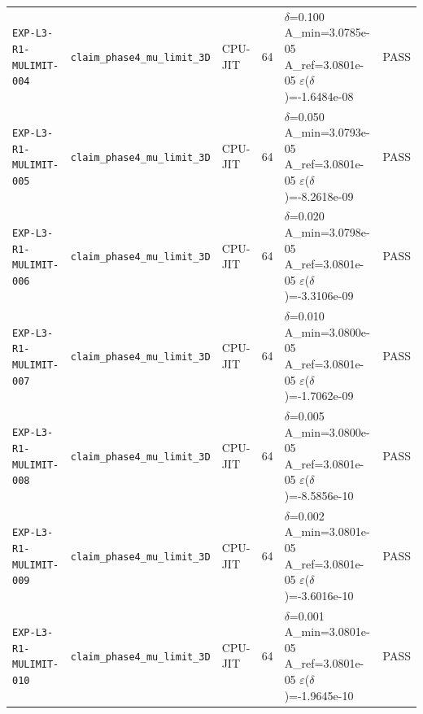 {\begin{longtable}{@{}>{\raggedright\arraybackslash}p{} >{\raggedright\arraybackslash}p{} l l >{\raggedright\arraybackslash}p{} l@{}}
\texttt{EXP-\allowbreak{}L3-\allowbreak{}R1-\allowbreak{}MULIMIT-\allowbreak{}004} & \texttt{claim\_\allowbreak{}phase4\_\allowbreak{}mu\_\allowbreak{}limit\_\allowbreak{}3D} & CPU-\allowbreak{}JIT & 64 & $\delta$=\allowbreak{}0.100  A\_\allowbreak{}min=\allowbreak{}3.0785e-05  A\_\allowbreak{}ref=\allowbreak{}3.0801e-05  $\varepsilon$($\delta$)=-\allowbreak{}1.6484e-08 & \textsf{PASS}\\
\texttt{EXP-\allowbreak{}L3-\allowbreak{}R1-\allowbreak{}MULIMIT-\allowbreak{}005} & \texttt{claim\_\allowbreak{}phase4\_\allowbreak{}mu\_\allowbreak{}limit\_\allowbreak{}3D} & CPU-\allowbreak{}JIT & 64 & $\delta$=\allowbreak{}0.050  A\_\allowbreak{}min=\allowbreak{}3.0793e-05  A\_\allowbreak{}ref=\allowbreak{}3.0801e-05  $\varepsilon$($\delta$)=-\allowbreak{}8.2618e-09 & \textsf{PASS}\\
\texttt{EXP-\allowbreak{}L3-\allowbreak{}R1-\allowbreak{}MULIMIT-\allowbreak{}006} & \texttt{claim\_\allowbreak{}phase4\_\allowbreak{}mu\_\allowbreak{}limit\_\allowbreak{}3D} & CPU-\allowbreak{}JIT & 64 & $\delta$=\allowbreak{}0.020  A\_\allowbreak{}min=\allowbreak{}3.0798e-05  A\_\allowbreak{}ref=\allowbreak{}3.0801e-05  $\varepsilon$($\delta$)=-\allowbreak{}3.3106e-09 & \textsf{PASS}\\
\texttt{EXP-\allowbreak{}L3-\allowbreak{}R1-\allowbreak{}MULIMIT-\allowbreak{}007} & \texttt{claim\_\allowbreak{}phase4\_\allowbreak{}mu\_\allowbreak{}limit\_\allowbreak{}3D} & CPU-\allowbreak{}JIT & 64 & $\delta$=\allowbreak{}0.010  A\_\allowbreak{}min=\allowbreak{}3.0800e-05  A\_\allowbreak{}ref=\allowbreak{}3.0801e-05  $\varepsilon$($\delta$)=-\allowbreak{}1.7062e-09 & \textsf{PASS}\\
\texttt{EXP-\allowbreak{}L3-\allowbreak{}R1-\allowbreak{}MULIMIT-\allowbreak{}008} & \texttt{claim\_\allowbreak{}phase4\_\allowbreak{}mu\_\allowbreak{}limit\_\allowbreak{}3D} & CPU-\allowbreak{}JIT & 64 & $\delta$=\allowbreak{}0.005  A\_\allowbreak{}min=\allowbreak{}3.0800e-05  A\_\allowbreak{}ref=\allowbreak{}3.0801e-05  $\varepsilon$($\delta$)=-\allowbreak{}8.5856e-10 & \textsf{PASS}\\
\texttt{EXP-\allowbreak{}L3-\allowbreak{}R1-\allowbreak{}MULIMIT-\allowbreak{}009} & \texttt{claim\_\allowbreak{}phase4\_\allowbreak{}mu\_\allowbreak{}limit\_\allowbreak{}3D} & CPU-\allowbreak{}JIT & 64 & $\delta$=\allowbreak{}0.002  A\_\allowbreak{}min=\allowbreak{}3.0801e-05  A\_\allowbreak{}ref=\allowbreak{}3.0801e-05  $\varepsilon$($\delta$)=-\allowbreak{}3.6016e-10 & \textsf{PASS}\\
\texttt{EXP-\allowbreak{}L3-\allowbreak{}R1-\allowbreak{}MULIMIT-\allowbreak{}010} & \texttt{claim\_\allowbreak{}phase4\_\allowbreak{}mu\_\allowbreak{}limit\_\allowbreak{}3D} & CPU-\allowbreak{}JIT & 64 & $\delta$=\allowbreak{}0.001  A\_\allowbreak{}min=\allowbreak{}3.0801e-05  A\_\allowbreak{}ref=\allowbreak{}3.0801e-05  $\varepsilon$($\delta$)=-\allowbreak{}1.9645e-10 & \textsf{PASS}\\

\end{longtable}}
